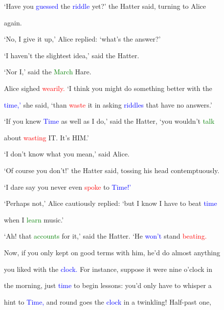  ‘Have you \textcolor{blue}{guessed} the \textcolor{blue}{riddle} yet?’ the Hatter said, turning to Alice

 again.



 ‘No, I give it up,’ Alice replied: ‘what’s the answer?’



 ‘I haven’t the slightest idea,’ said the Hatter.



 ‘Nor I,’ said the \textcolor{green}{March} Hare.



 Alice sighed \textcolor{red}{wearily.} ‘I think you might do something better with the

 \textcolor{blue}{time,’} she said, ‘than \textcolor{red}{waste} it in asking \textcolor{blue}{riddles} that have no answers.’



 ‘If you knew \textcolor{blue}{Time} as well as I do,’ said the Hatter, ‘you wouldn’t \textcolor{green}{talk}

 about \textcolor{red}{wasting} IT. It’s HIM.’



 ‘I don’t know what you mean,’ said Alice.



 ‘Of course you don’t!’ the Hatter said, tossing his head contemptuously.

 ‘I \textcolor{BurntOrange}{dare} say you never even \textcolor{red}{spoke} to \textcolor{blue}{Time!’}



 ‘Perhaps not,’ Alice \textcolor{BurntOrange}{cautiously} replied: ‘but I know I have to beat \textcolor{blue}{time}

 when I \textcolor{green}{learn} \textcolor{BurntOrange}{music.’}



 ‘Ah! that \textcolor{green}{accounts} for it,’ said the Hatter. ‘He \textcolor{blue}{won’t} stand \textcolor{red}{beating.}

 Now, if you only kept on \textcolor{BurntOrange}{good} terms with him, he’d do almost anything

 you liked with the \textcolor{blue}{clock.} For instance, suppose it were nine o’clock in

 the morning, just \textcolor{blue}{time} to begin \textcolor{BurntOrange}{lessons:} you’d only have to whisper a

 hint to \textcolor{blue}{Time,} and round goes the \textcolor{blue}{clock} in a \textcolor{BurntOrange}{twinkling!} Half-past one,

